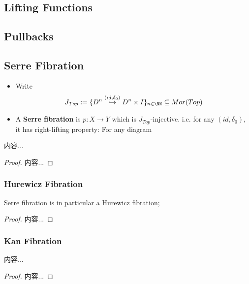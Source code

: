 \documentclass[Total.tex]{subfiles}
\begin{document}
			\subsection{Lifting Functions}
			\subsection{Pullbacks}
			\subsection{Serre Fibration}
			\begin{Def}
				\begin{itemize}
					\item Write
					\begin{gather*}
						J_{Top}:=\{D^n\stackrel{(id,\delta_0)}{\hookrightarrow} D^n\times I\}_{n\in \NN}\subseteq Mor(Top)
					\end{gather*}
					\item A \textbf{Serre fibration} is $p:X\rightarrow Y$ which is $J_{Top}$-injective. i.e. for any $(id,\delta_0)$, it has right-lifting property: For any diagram
					\begin{center}
					\end{center}
				\end{itemize}
			\end{Def}
			
			
			\begin{proposition}
				内容...
			\end{proposition}
			\begin{proof}
				内容...
			\end{proof}
			\subsubsection{Hurewicz Fibration}
			\begin{proposition}
				Serre fibration is in particular a Hurewicz fibration;
			\end{proposition}
			\begin{proof}
				内容...
			\end{proof}
			\subsubsection{Kan Fibration}
			\begin{proposition}
				内容...
			\end{proposition}
			\begin{proof}
				内容...
			\end{proof}
\end{document}
